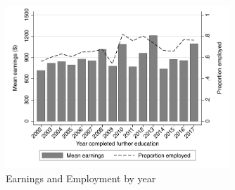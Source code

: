 \documentclass[12pt, a4paper]{article}
\begin{document}
\begin{figure}[H]
\centering
\caption{Earnings and Employment by year}
\vspace{0.5cm}
  \label{fig:yearearnempl}
    \includegraphics[width=0.75\textwidth]{_figures/mean_earnings_empl_year.pdf}
\end{figure}


%
%
\end{document}
